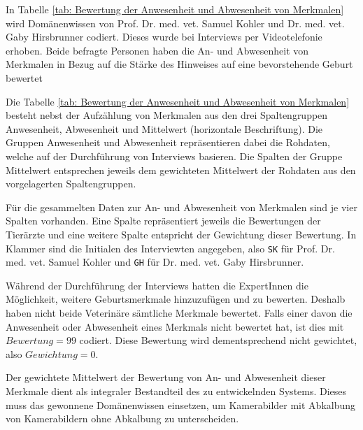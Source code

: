 In Tabelle \ref{tab: Bewertung der Anwesenheit und Abwesenheit von Merkmalen} wird Domänenwissen von Prof. Dr. med. vet. Samuel Kohler und  Dr. med. vet. Gaby Hirsbrunner codiert. Dieses wurde bei Interviews per Videotelefonie erhoben. Beide befragte Personen haben die An- und Abwesenheit von Merkmalen in Bezug auf die Stärke des Hinweises auf eine bevorstehende Geburt bewertet

Die Tabelle \ref{tab: Bewertung der Anwesenheit und Abwesenheit von Merkmalen} besteht nebst der Aufzählung von Merkmalen aus den drei Spaltengruppen \flqq{}Anwesenheit\frqq{}, \flqq{}Abwesenheit\frqq{} und \flqq{}Mittelwert\frqq{} (horizontale Beschriftung). Die Gruppen \flqq{}Anwesenheit\frqq{} und \flqq{}Abwesenheit\frqq{} repräsentieren dabei die Rohdaten, welche auf der Durchführung von Interviews basieren. Die Spalten der Gruppe \flqq{}Mittelwert\frqq{} entsprechen jeweils dem gewichteten Mittelwert der Rohdaten aus den vorgelagerten Spaltengruppen.

Für die gesammelten Daten zur An- und Abwesenheit von Merkmalen sind je vier Spalten vorhanden. Eine Spalte repräsentiert jeweils die Bewertungen der Tierärzte und eine weitere Spalte entspricht der Gewichtung dieser Bewertung. In Klammer sind die Initialen des Interviewten angegeben, also \texttt{SK} für Prof. Dr. med. vet. Samuel Kohler und  \texttt{GH} für Dr. med. vet. Gaby Hirsbrunner.

Während der Durchführung der Interviews hatten die ExpertInnen die Möglichkeit, weitere Geburtsmerkmale hinzuzufügen und zu bewerten. Deshalb haben nicht beide Veterinäre sämtliche Merkmale bewertet. Falls einer davon die Anwesenheit oder Abwesenheit eines Merkmals nicht bewertet hat, ist dies mit $Bewertung=99$ codiert. Diese Bewertung wird dementsprechend nicht gewichtet, also \newline $Gewichtung=0$. 

Der gewichtete Mittelwert der Bewertung von An- und Abwesenheit dieser Merkmale dient als integraler Bestandteil des zu entwickelnden Systems. Dieses muss das gewonnene Domänenwissen einsetzen, um Kamerabilder mit Abkalbung von Kamerabildern ohne Abkalbung zu unterscheiden.



